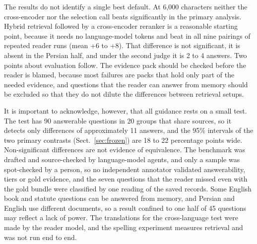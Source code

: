 The results do not identify a single best default. At 6,000 characters neither the cross-encoder nor the selection call beats \hybrid{} significantly in the primary analysis. Hybrid retrieval followed by a cross-encoder reranker is a reasonable starting point, because it needs no language-model tokens and \hr{} beat \hybrid{} in all nine pairings of repeated reader runs (mean +6 to +8). That difference is not significant, it is absent in the Persian half, and under the second judge it is 2 to 4 answers. Two points about evaluation follow. The evidence pack should be checked before the reader is blamed, because most failures are packs that hold only part of the needed evidence, and questions that the reader can answer from memory should be excluded so that they do not dilute the differences between retrieval setups.

It is important to acknowledge, however, that all guidance rests on a small test. The test has 90 answerable questions in 20 groups that share sources, so it detects only differences of approximately 11 answers, and the 95\% intervals of the two primary contrasts (Sect.~\ref{sec:frozen}) are 18 to 22 percentage points wide. Non-significant differences are not evidence of equivalence. The benchmark was drafted and source-checked by language-model agents, and only a sample was spot-checked by a person, so no independent annotator validated answerability, tiers or gold evidence, and the seven questions that the reader missed even with the gold bundle were classified by one reading of the saved records. Some English book and statute questions can be answered from memory, and Persian and English use different documents, so a result confined to one half of 45 questions may reflect a lack of power. The translations for the cross-language test were made by the reader model, and the spelling experiment measures retrieval and was not run end to end.


